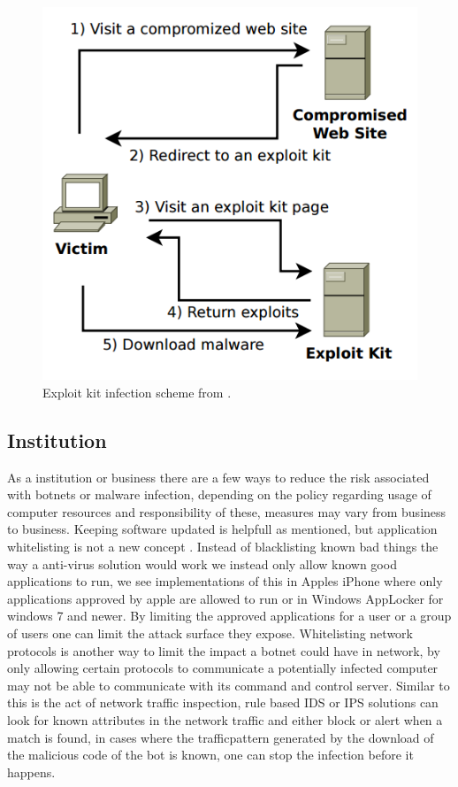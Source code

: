 \begin{figure}
	\centering
	\includegraphics[scale=0.4]{fig/jan-ek-inf}
	\caption{Exploit kit infection scheme from \cite{jan-kotov-ek}.}
	\label{jan-ek-infection}
\end{figure}

\subsection{Institution}%
As a institution or business there are a few ways to reduce the risk associated with botnets or malware infection, depending on the policy regarding usage of computer resources and responsibility of these, measures may vary from business to business.
Keeping software updated is helpfull as mentioned, but application whitelisting is not a new concept \cite{jan-mansfield-whitelist}. Instead of blacklisting known bad things the way a anti-virus solution would work we instead only allow known good applications to run, we see implementations of this in Apples iPhone where only applications approved by apple are allowed to run or in Windows AppLocker \cite{jan-windows-applocker} for windows 7 and newer. By limiting the approved applications for a user or a group of users one can limit the attack surface they expose.
Whitelisting network protocols is another way to limit the impact a botnet could have in network, by only allowing certain protocols to communicate a potentially infected computer may not be able to communicate with its command and control server. Similar to this is the act of network traffic inspection, rule based IDS or IPS solutions can look for known attributes in the network traffic and either block or alert when a match is found, in cases where the trafficpattern generated by the download of the malicious code of the bot is known, one can stop the infection before it happens. 




